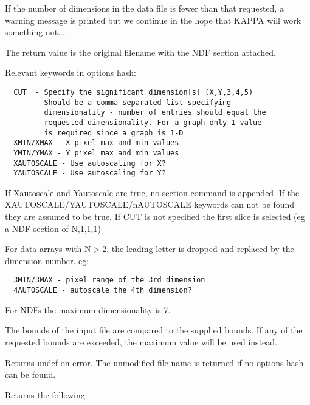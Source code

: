 \begin{description}
If the number of dimensions in the data file
is fewer than that requested, a warning message is printed
but we continue in the hope that KAPPA will work something out....



The return value is the original filename with the
NDF section attached.



Relevant keywords in options hash:

\begin{verbatim}
  CUT  - Specify the significant dimension[s] (X,Y,3,4,5)
         Should be a comma-separated list specifying 
         dimensionality - number of entries should equal the
         requested dimensionality. For a graph only 1 value
         is required since a graph is 1-D
  XMIN/XMAX - X pixel max and min values
  YMIN/YMAX - Y pixel max and min values
  XAUTOSCALE - Use autoscaling for X?
  YAUTOSCALE - Use autoscaling for Y?
\end{verbatim}


If Xautoscale and Yautoscale are true, no section command is appended.
If the XAUTOSCALE/YAUTOSCALE/nAUTOSCALE keywords can not be found they are
assumed to be true. If CUT is not specified  the first slice is
selected (eg a NDF section of N,1,1,1)



For data arrays with N$>$2, the leading letter is dropped and replaced
by the dimension number. eg:

\begin{verbatim}
  3MIN/3MAX - pixel range of the 3rd dimension
  4AUTOSCALE - autoscale the 4th dimension?
\end{verbatim}


For NDFs the maximum dimensionality is 7.



The bounds of the input file are compared to the supplied bounds.
If any of the requested bounds are exceeded, the maximum value
will be used instead.



Returns undef on error.
The unmodified file name is returned if no options hash can be found.



Returns the following:


\end{description}
